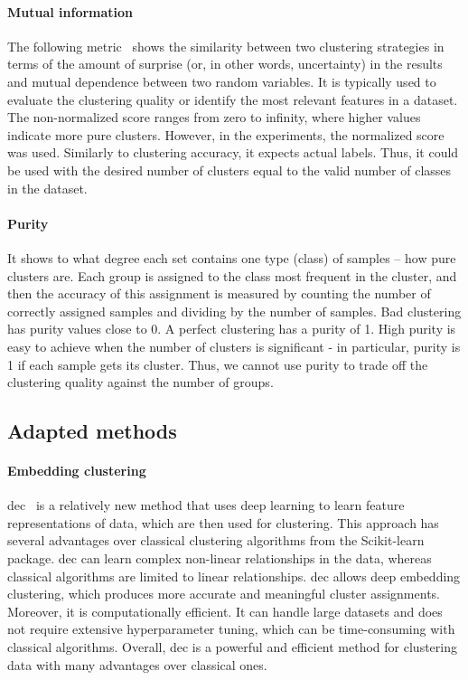 \documentclass[a4paper, 10pt, twoside]{report}
\begin{document}
\paragraph{Mutual information}
The following metric~\cite{adjuster_mutual_info} shows the similarity between two clustering strategies in terms of the amount of surprise (or, in other words, uncertainty) in the results and mutual dependence between two random variables. It is typically used to evaluate the clustering quality or identify the most relevant features in a dataset. The non-normalized score ranges from zero to infinity, where higher values indicate more pure clusters. However, in the experiments, the normalized score was used. Similarly to clustering accuracy, it expects actual labels. Thus, it could be used with the desired number of clusters equal to the valid number of classes in the dataset.

\paragraph{Purity}
It shows to what degree each set contains one type (class) of samples -- how pure clusters are. Each group is assigned to the class most frequent in the cluster, and then the accuracy of this assignment is measured by counting the number of correctly assigned samples and dividing by the number of samples. Bad clustering has purity values close to 0. A perfect clustering has a purity of 1. High purity is easy to achieve when the number of clusters is significant - in particular, purity is 1 if each sample gets its cluster. Thus, we cannot use purity to trade off the clustering quality against the number of groups.

\subsection{Adapted methods}
\label{part:methods:materials:classification:methods}

\paragraph{Embedding clustering}

\acrfull{dec}~\cite{DEC} is a relatively new method that uses deep learning to learn feature representations of data, which are then used for clustering. This approach has several advantages over classical clustering algorithms from the Scikit-learn package. \acrshort{dec} can learn complex non-linear relationships in the data, whereas classical algorithms are limited to linear relationships. \acrshort{dec} allows deep embedding clustering, which produces more accurate and meaningful cluster assignments. Moreover, it is computationally efficient. It can handle large datasets and does not require extensive hyperparameter tuning, which can be time-consuming with classical algorithms. Overall, \acrshort{dec} is a powerful and efficient method for clustering data with many advantages over classical ones.
\end{document}
